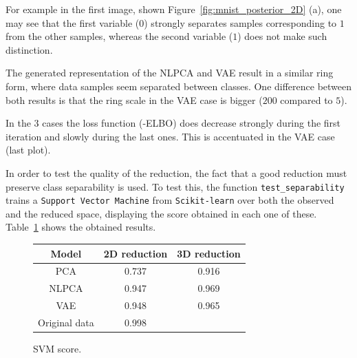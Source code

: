 For example in the first image, shown Figure~\ref{fig:mnist_posterior_2D} (a), one may see that the first variable (\(0\)) strongly separates samples corresponding to \(1\) from the other samples, whereas the second variable (\(1\)) does not make such distinction.

The generated representation of the NLPCA and VAE result in a similar ring form, where data samples seem separated between classes. One difference between both results is that the ring scale in the VAE case is bigger (\(200\) compared to \(5\)).

In the 3 cases the loss function (-ELBO) does decrease strongly during the first iteration and slowly during the last ones. This is accentuated in the VAE case (last plot).


In order to test the quality of the reduction, the fact that a good reduction must preserve class separability is used. To test this, the function \texttt{test\_separability} trains a \texttt{Support Vector Machine} from \texttt{Scikit-learn} over both the observed and the reduced space, displaying the score obtained in each one of these. Table~\ref{tab:mnist} shows the obtained results.


\begin{figure}
  \centering
  \begin{tabular}{ccc}
    \hline
    Model    & 2D reduction & 3D reduction \\\hline
    PCA      & 0.737 & 0.916\\
    NLPCA    & 0.947 & 0.969\\
    VAE      & 0.948 & 0.965\\
    \hline
    \hline
    Original data & 0.998 \\
    \hline
  \end{tabular}
  \caption{SVM score.}\label{tab:mnist}
\end{figure}

